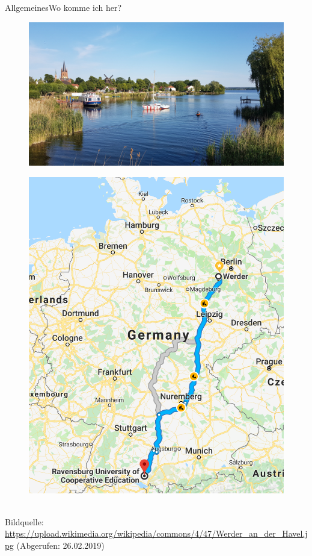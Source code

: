 \begin{frame}{Allgemeines}{Wo komme ich her?}
	\begin{minipage}{0.7\textwidth}
	\centering
		\begin{figure}
		\centering
		\includegraphics[width=.95\linewidth]{graph/werder.jpg}
	\end{figure}
	\end{minipage}%
	\begin{minipage}{0.3\textwidth}
	\centering
		\begin{figure}
		\centering
		\includegraphics[width=.95\linewidth]{graph/route2werder.png}
		\end{figure}
	\end{minipage}
	\\
	\tiny{Bildquelle: \url{https://upload.wikimedia.org/wikipedia/commons/4/47/Werder_an_der_Havel.jpg} (Abgerufen: 26.02.2019)}
\end{frame}

